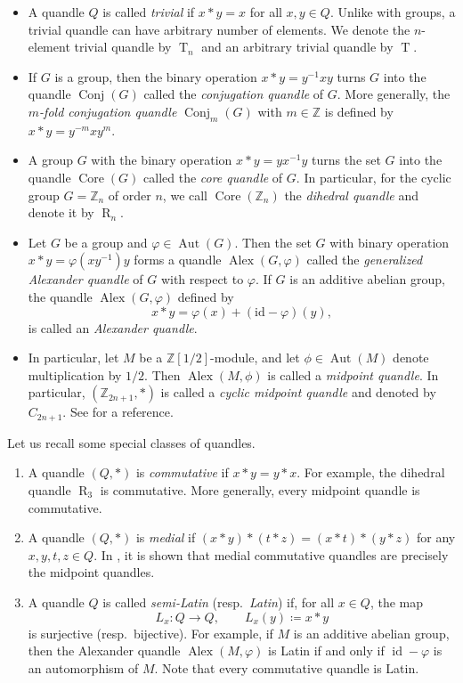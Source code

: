 \documentclass[12 pt]{amsart}
\theoremstyle{definition}
\theoremstyle{remark}
\numberwithin{equation}{section}
\newcommand{\Alex}{\operatorname{Alex}}
\newcommand{\Aut}{\operatorname{Aut}}
\newcommand{\Conj}{\operatorname{Conj}}
\newcommand{\Core}{\operatorname{Core}}
\newcommand{\T}{\operatorname{T}}
\newcommand{\R}{\operatorname{R}}
\newcommand{\Z}{\mathbb{Z}}
\newcommand{\id}{\mathrm{id}}
\begin{document}
\begin{itemize}
\item 
A quandle  $Q$ is called {\it trivial} if $x*y=x$ for all $x, y \in Q$.  Unlike with groups, a trivial quandle can have arbitrary number of elements. We denote the $n$-element trivial quandle by $\T_n$ and an arbitrary trivial quandle by $\T$.
\item If $G$ is a group, then the binary operation $x*y= y^{-1} x y$ turns $G$ into the quandle $\Conj(G)$ called the {\it conjugation quandle} of $G$. More generally, the \emph{$m$-fold conjugation quandle} $\Conj_m(G)$ with $m\in\Z$ is defined by $x*y=y^{-m}xy^m$.
\item A group $G$ with the binary operation $x*y= y x^{-1} y$ turns the set $G$ into the quandle $\Core(G)$ called the {\it core quandle} of $G$. In particular, for the cyclic group $G= \mathbb{Z}_n$ of order $n$, we call $\Core(\Z_n)$ the {\it dihedral quandle} and denote it by $\R_n$.
\item Let $G$ be a group and $\varphi \in \Aut(G)$. Then the set $G$ with binary operation $x * y = \varphi(xy^{-1})y$ forms a quandle $\Alex(G, \varphi)$ called the  {\it generalized Alexander quandle} of $G$ with respect to $\varphi$. If $G$ is an additive abelian group, the quandle $\Alex(G, \varphi)$ defined by $$x\ast y= \varphi(x)+(\id-\varphi)(y),$$  is called an {\it Alexander quandle}. 
\item In particular, let $M$ be a $\Z[1/2]$-module, and let $\phi\in\Aut(M)$ denote multiplication by $1/2$. Then $\Alex(M,\phi)$ is called a \emph{midpoint quandle}. In particular, $(\Z_{2n+1},*)$ is called a \emph{cyclic midpoint quandle} and denoted by $C_{2n+1}$. See \cite{LT1} for a reference.
\end{itemize}


Let us recall some special classes of quandles.
\begin{enumerate}
\item A quandle $(Q,\ast)$ is {\it commutative} if $x\ast y=y\ast x$. For example, the dihedral quandle $\R_3$ is commutative. More generally, every midpoint quandle is commutative.
 \item  A quandle $(Q,\ast)$ is {\it medial} if $(x\ast y)\ast(t\ast z)=(x\ast t)\ast(y\ast z)$ for any $x, y, t, z \in Q$. In \cite{LT1}, it is shown that medial commutative quandles are precisely the midpoint quandles.
 
\item  A quandle $Q$ is called \emph{semi-Latin} (resp.\ {\it Latin}) if, for all $x\in Q$, the map \[L_x \colon Q \to Q,\qquad L_x(y) \coloneq x *y\] is surjective (resp.\ bijective). For example, if $M$ is an additive abelian group, then the Alexander quandle $\operatorname{Alex}(M,\varphi)$ is Latin if and only if $\operatorname{id}-\varphi$ is an automorphism of $M$. Note that every commutative quandle is Latin.
\end{enumerate}
\end{document}
